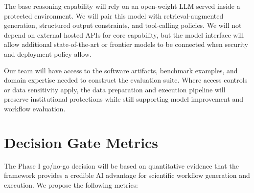 \documentclass[11pt]{article} \usepackage[margin=1in]{geometry}
\begin{document}
The base reasoning capability will rely on an open-weight LLM served inside a
protected environment. We will pair this model with retrieval-augmented
generation, structured output constraints, and tool-calling policies. We will
not depend on external hosted APIs for core capability, but the model interface
will allow additional state-of-the-art or frontier models to be connected when
security and deployment policy allow.

Our team will have access to the software artifacts, benchmark examples, and
domain expertise needed to construct the evaluation suite. Where access controls
or data sensitivity apply, the data preparation and execution pipeline will
preserve institutional protections while still supporting model improvement and
workflow evaluation.

\section{Decision Gate Metrics} The Phase I go/no-go decision will be based on
quantitative evidence that the framework provides a credible AI advantage for
scientific workflow generation and execution. We propose the following metrics:
\end{document}
